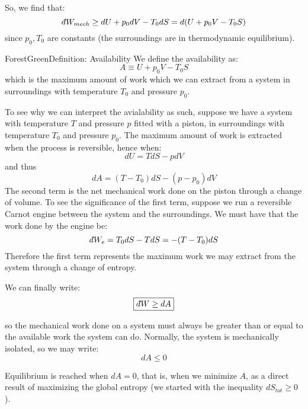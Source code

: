 \documentclass[a4paper,11pt,oneside]{book}
\newcommand{\dbar}{d\hspace*{-0.08em}\bar{}\hspace*{0.1em}}
\begin{document}
So, we find that:
\begin{equation}
    \dbar W_{mech} \geq dU + p_0 dV - T_0dS = d(U+p_0V-T_0S)
\end{equation}
since $p_0, T_0$ are constants (the surroundings are in thermodynamic equilibrium).
\begin{mybox}{ForestGreen}{Definition: Availability}
We define the availability as:
\begin{equation}
    \boxed{A \equiv U+p_0V-T_0S }
\end{equation}
which is the maximum amount of work which we can extract from a system in surroundings with temperature $T_0$ and pressure $p_0$. 
\end{mybox}

To see why we can interpret the avialability as such, suppose we have a system with temperature $T$ and pressure $p$ fitted with a piston, in surroundings with temperature $T_0$ and pressure $p_0$. The maximum amount of work is extracted when the process is reversible, hence when:
\begin{equation}
    dU = TdS - pdV
\end{equation}
and thus 
\begin{equation}
    dA = (T-T_0) dS - (p-p_0) dV
\end{equation}
The second term is the net mechanical work done on the piston through a change of volume. To see the significance of the first term, suppose we run a reversible Carnot engine between the system and the surroundings. We must have that the work done by the engine be:
\begin{equation}
    \dbar W_e = T_0dS-TdS = -(T-T_0) dS
\end{equation}
Therefore the first term represents the maximum work we may extract from the system through a change of entropy. 


We can finally write:
\begin{equation}
    \boxed{\dbar W \geq dA}
\end{equation}

so the mechanical work done on a system must always be greater than or equal to the available work the system can do. Normally, the system is mechanically isolated, so we may write:
\begin{equation}
    dA \leq 0
\end{equation}


Equilibrium is reached when $dA = 0$, that is, when we minimize $A$, as a direct result of maximizing the global entropy (we started with the inequality $dS_{tot}\geq 0$). 
\end{document}
